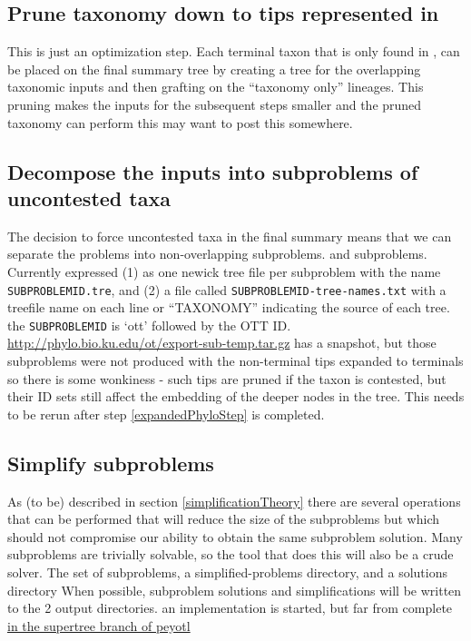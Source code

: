 \documentclass[11pt]{article}
\begin{document}
\subsection{Prune taxonomy down to tips represented in \expandedPhylo}\label{prunedTaxonomyStep}
\stepExplanation This is just an optimization step.
Each terminal taxon that is only found in \taxonomy, can be placed on the 
    final summary tree by creating a tree for the overlapping taxonomic
    inputs and then grafting on the ``taxonomy only'' lineages.
This pruning makes the inputs for the subsequent steps smaller
\stepInput \taxonomy and \expandedPhylo
\stepOutput \prunedTaxonomy the pruned taxonomy
\currImpl \otcprune can perform this
\implTODO
\currURL may want to post this somewhere. 

\subsection{Decompose the inputs into subproblems of uncontested taxa}\label{decomposeStep}
\stepExplanation The decision to force uncontested taxa in the final
    summary means that we can separate the problems into non-overlapping
    subproblems.
\stepInput \prunedTaxonomy and \expandedPhylo
\stepOutput subproblems. Currently expressed (1) as one newick tree file  per subproblem
    with the name \texttt{SUBPROBLEMID.tre}, and
    (2) a file called \texttt{SUBPROBLEMID-tree-names.txt} with a treefile name 
    on each line or ``TAXONOMY'' indicating the source of each tree. 
    the \texttt{SUBPROBLEMID} is `ott' followed by the OTT ID.
\currImpl \otcdecompose
\implTODO 
\currURL \url{http://phylo.bio.ku.edu/ot/export-sub-temp.tar.gz} has a snapshot, but
those subproblems were not produced with the non-terminal tips expanded to terminals
so there is some wonkiness - such tips are pruned if the taxon is contested, but their
ID sets still affect the embedding of the deeper nodes in the tree. This needs 
to be rerun after step \ref{expandedPhyloStep} is completed.
 
\subsection{Simplify subproblems}\label{simplifyStep}
\stepExplanation As (to be) described in section \ref{simplificationTheory} there
    are several operations that can be performed that will reduce the size of the
    subproblems but which should not compromise our ability to obtain the same
    subproblem solution.
    Many subproblems are trivially solvable, so the tool that does this
    will also be a crude solver.
\stepInput The set of subproblems, a simplified-problems directory, and a solutions directory
\stepOutput When possible, subproblem solutions and simplifications will be written to the 2 output directories.
\currImpl an implementation is started, but far from complete \href{https://github.com/OpenTreeOfLife/peyotl/blob/supertree/scripts/supertree/simplify_subproblems.py}{in the supertree branch of peyotl}
\implTODO {}
\currURL 
 
\end{document}
